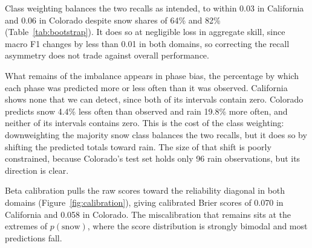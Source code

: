 \documentclass[twocol]{ametsocV6.1} %
\begin{document}
Class weighting balances the two recalls as intended, to within 0.03 in
California and 0.06 in Colorado despite snow shares of 64\% and 82\%
(Table~\ref{tab:bootstrap}). It does so at negligible loss in aggregate
skill, since macro F1 changes by less than 0.01 in both domains, so
correcting the recall asymmetry does not trade against overall
performance.

What remains of the imbalance appears in phase bias, the percentage by
which each phase was predicted more or less often than it was observed.
California shows none that we can detect, since both of its intervals
contain zero. Colorado predicts snow 4.4\% less often than observed and
rain 19.8\% more often, and neither of its intervals contains zero. This
is the cost of the class weighting: downweighting the majority snow
class balances the two recalls, but it does so by shifting the predicted
totals toward rain. The size of that shift is poorly constrained,
because Colorado's test set holds only 96 rain observations, but its
direction is clear.

Beta calibration pulls the raw scores toward the reliability diagonal
in both domains (Figure~\ref{fig:calibration}), giving calibrated Brier
scores of 0.070 in California and 0.058 in Colorado. The miscalibration
that remains sits at the extremes of $p(\mathrm{snow})$, where the score
distribution is strongly bimodal and most predictions fall.
\end{document}
